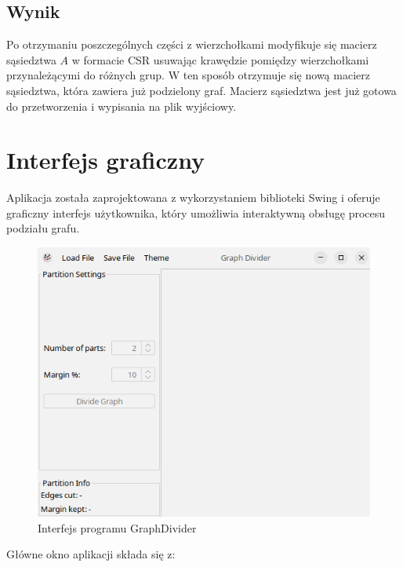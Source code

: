 \documentclass{article}
\begin{document}
    \subsection{Wynik}

    Po otrzymaniu poszczególnych części z wierzchołkami modyfikuje się macierz sąsiedztwa \(A\) w formacie CSR usuwając krawędzie pomiędzy wierzchołkami przynależącymi do różnych grup. W ten sposób otrzymuje się nową macierz sąsiedztwa, która zawiera już podzielony graf. Macierz sąsiedztwa jest już gotowa do przetworzenia i wypisania na plik wyjściowy.
    


\section{Interfejs graficzny}

    Aplikacja została zaprojektowana z wykorzystaniem biblioteki Swing i oferuje graficzny interfejs użytkownika, który umożliwia interaktywną obsługę procesu podziału grafu.

    \begin{figure}[H]
        \centering
        \includegraphics[width=1\linewidth]{img/gui.png}
        \caption{Interfejs programu GraphDivider}
        \label{fig:gui}
    \end{figure}


    Główne okno aplikacji składa się z:
    
\end{document}
